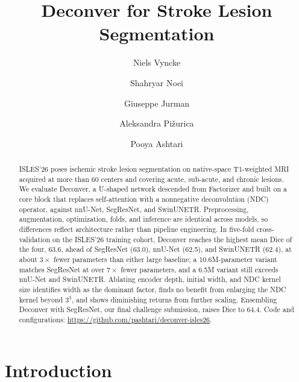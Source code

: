 \documentclass[runningheads,a4paper]{llncs}
\begin{document}
%
\title{Deconver for Stroke Lesion Segmentation}
%
%
\author{Niels Vyncke \and
Shahryar Noei \and
Giuseppe Jurman \and
Aleksandra Pi\v{z}urica \and
Pooya Ashtari}
%
%
%
\maketitle              %
%
\begin{abstract}
ISLES'26 poses ischemic stroke lesion segmentation on native-space T1-weighted MRI acquired at more than 60 centers and covering acute, sub-acute, and chronic lesions. We evaluate Deconver, a U-shaped network descended from Factorizer and built on a core block that replaces self-attention with a nonnegative deconvolution (NDC) operator, against nnU-Net, SegResNet, and SwinUNETR. Preprocessing, augmentation, optimization, folds, and inference are identical across models, so differences reflect architecture rather than pipeline engineering. In five-fold cross-validation on the ISLES'26 training cohort, Deconver reaches the highest mean Dice of the four, 63.6, ahead of SegResNet (63.0), nnU-Net (62.5), and SwinUNETR (62.4), at about $3\times$ fewer parameters than either large baseline; a 10.6M-parameter variant matches SegResNet at over $7\times$ fewer parameters, and a 6.5M variant still exceeds nnU-Net and SwinUNETR. Ablating encoder depth, initial width, and NDC kernel size identifies width as the dominant factor, finds no benefit from enlarging the NDC kernel beyond $3^3$, and shows diminishing returns from further scaling. Ensembling Deconver with SegResNet, our final challenge submission, raises Dice to 64.4. Code and configurations: \url{https://github.com/pashtari/deconver-isles26}.

\end{abstract}
%
\section{Introduction}

\end{document}
